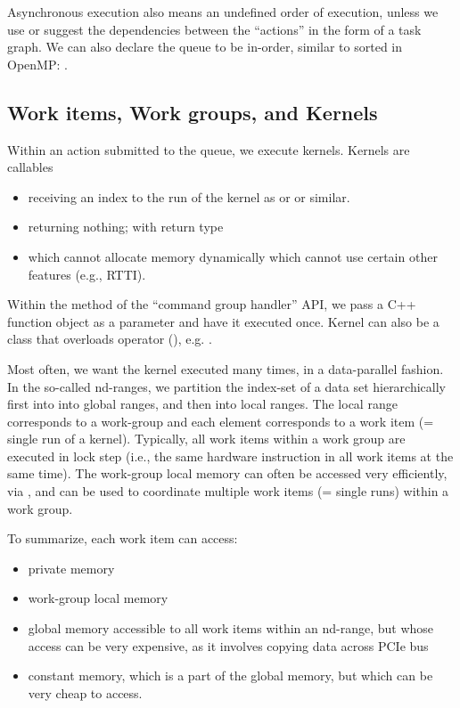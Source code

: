 Asynchronous execution also means an undefined order of execution, 
unless we use  or suggest the dependencies between the ``actions'' in the form of a task graph.
We can also declare the queue to be in-order, similar to sorted in OpenMP:
.


 \subsection{Work items, Work groups, and Kernels}

Within an action submitted to the queue, we execute kernels.
 Kernels are callables 
 \begin{itemize}
 \item receiving an index to the run of the kernel as  or  or similar.
 \item returning nothing; with  return type 
 \item which cannot allocate memory dynamically
 \itme which cannot use certain other features (e.g., RTTI). 
\end{itemize}
Within the  method of the ``command group handler'' API, 
we pass a C++ function object as a parameter and have it executed once. 
Kernel can also be a class that overloads operator (), e.g. .

Most often, we want the kernel executed many times, in a data-parallel fashion. 
In the so-called nd-ranges, we partition the index-set of a data set hierarchically first into into global ranges, and then into local ranges. 
The local range corresponds to a work-group and each element corresponds to a work item (= single run of a kernel). 
Typically, all work items within a work group are executed in lock step (i.e., the same hardware instruction in all work items at the same time).
The work-group local memory can often be accessed very efficiently, via , and can be used to coordinate multiple work items (= single runs) within a work group.

To summarize, each work item can access:
\begin{itemize}
\item private memory
\item work-group local memory
\item global memory accessible to all work items within an nd-range, but whose access can be very expensive, as it involves copying data across PCIe bus
\item constant memory, which is a part of the global memory, but which can be very cheap to access. 
\end{itemize}

